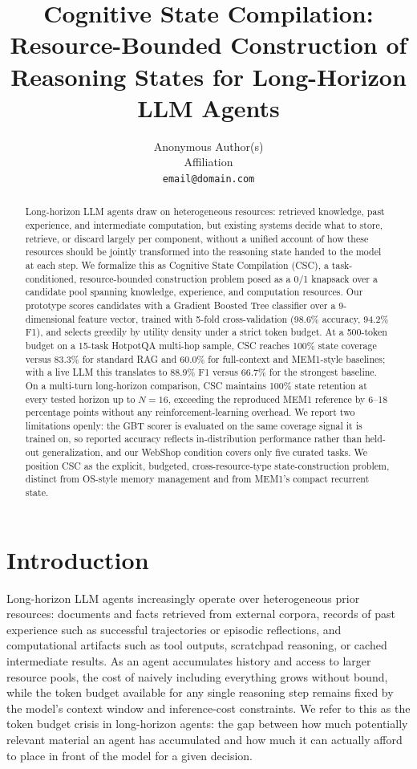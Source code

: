 \documentclass{article}
\title{Cognitive State Compilation: Resource-Bounded Construction of \\ Reasoning States for Long-Horizon LLM Agents}
\author{
  Anonymous Author(s) \\
  Affiliation \\
  \texttt{email@domain.com}
}
\begin{document}
\maketitle

\begin{abstract}
Long-horizon LLM agents draw on heterogeneous resources: retrieved knowledge, past experience, and intermediate computation, but existing systems decide what to store, retrieve, or discard largely per component, without a unified account of how these resources should be jointly transformed into the reasoning state handed to the model at each step. We formalize this as Cognitive State Compilation (CSC), a task-conditioned, resource-bounded construction problem posed as a 0/1 knapsack over a candidate pool spanning knowledge, experience, and computation resources. Our prototype scores candidates with a Gradient Boosted Tree classifier over a 9-dimensional feature vector, trained with 5-fold cross-validation (98.6\% accuracy, 94.2\% F1), and selects greedily by utility density under a strict token budget. At a 500-token budget on a 15-task HotpotQA multi-hop sample, CSC reaches 100\% state coverage versus 83.3\% for standard RAG and 60.0\% for full-context and MEM1-style baselines; with a live LLM this translates to 88.9\% F1 versus 66.7\% for the strongest baseline. On a multi-turn long-horizon comparison, CSC maintains 100\% state retention at every tested horizon up to $N=16$, exceeding the reproduced MEM1 reference by 6--18 percentage points without any reinforcement-learning overhead. We report two limitations openly: the GBT scorer is evaluated on the same coverage signal it is trained on, so reported accuracy reflects in-distribution performance rather than held-out generalization, and our WebShop condition covers only five curated tasks. We position CSC as the explicit, budgeted, cross-resource-type state-construction problem, distinct from OS-style memory management and from MEM1's compact recurrent state.
\end{abstract}

\section{Introduction}

Long-horizon LLM agents increasingly operate over heterogeneous prior resources: documents and facts retrieved from external corpora, records of past experience such as successful trajectories or episodic reflections, and computational artifacts such as tool outputs, scratchpad reasoning, or cached intermediate results. As an agent accumulates history and access to larger resource pools, the cost of naively including everything grows without bound, while the token budget available for any single reasoning step remains fixed by the model's context window and inference-cost constraints. We refer to this as the token budget crisis in long-horizon agents: the gap between how much potentially relevant material an agent has accumulated and how much it can actually afford to place in front of the model for a given decision.
\end{document}
